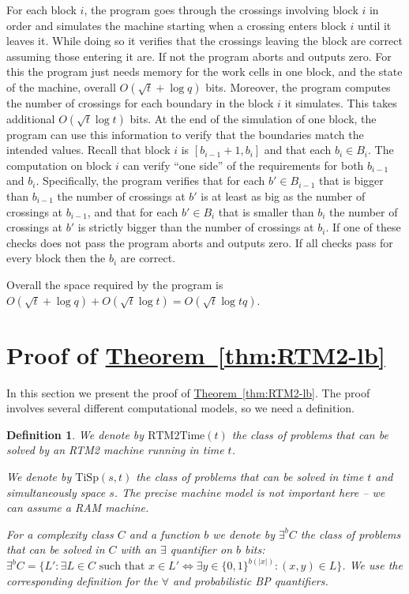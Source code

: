 \documentclass[11pt]{article}
\numberwithin{equation}{section}
\theoremstyle{definition}
\theoremstyle{plain}
\newcommand{\expref}[2]{\hyperref[#2]{#1~\ref{#2}}}
\newtheorem{defn}[theorem]{Definition}
\newcommand{\zo}{\{0, 1\}}
\newcommand{\TiSp}[2]{\ensuremath{\mathrm{TiSp} \left(#1,#2 \right)}}
\newcommand{\RTMTime}[1]{\ensuremath{\mathrm{RTM2Time} \left( #1 \right)}}
\begin{document}
For each block $i$, the program goes through the crossings involving
block $i$ in order and simulates the machine starting when a crossing
enters block $i$ until it leaves it. While doing so it verifies that
the crossings leaving the block are correct assuming those entering
it are. If not the program aborts and outputs zero. For this the program
just needs memory for the work cells in one block, and the state of
the machine, overall $O(\sqrt{t}+\log q)$ bits. Moreover, the program
computes the number of crossings for each boundary in the block $i$
it simulates. This takes additional $O(\sqrt{t}\log t)$ bits. At
the end of the simulation of one block, the program can use this information
to verify that the boundaries match the intended values. Recall that
block $i$ is $[b_{i-1}+1,b_{i}]$ and that each $b_{i}\in B_{i}$.
The computation on block $i$ can verify ``one side'' of the requirements
for both $b_{i-1}$ and $b_{i}$. Specifically, the program verifies
that for each $b'\in B_{i-1}$ that is bigger than $b_{i-1}$ the
number of crossings at $b'$ is at least as big as the number of crossings
at $b_{i-1}$, and that for each $b'\in B_{i}$ that is smaller than
$b_{i}$ the number of crossings at $b'$ is strictly bigger than
the number of crossings at $b_{i}$. If one of these checks does not
pass the program aborts and outputs zero. If all checks pass for every
block then the $b_{i}$ are correct.

Overall the space required by the program is $O(\sqrt{t}+\log q)+O(\sqrt{t}\log t)=O(\sqrt{t}\log tq)$.

\section{Proof of \expref{Theorem}{thm:RTM2-lb} \label{sec:Proof-of-lower-bound}}
%

In this section we present the proof of \expref{Theorem}{thm:RTM2-lb}.
The proof involves several different computational models, so we need
a definition.
\begin{defn}
We denote by $\RTMTime{t}$ the class of problems that can be solved
by an RTM2 machine running in time $t$.

We denote by $\TiSp{s}{t}$ the class of problems that can be solved
in time $t$ and simultaneously space $s$. The precise machine model
is not important here -- we can assume a RAM machine.

For a complexity class $C$ and a function $b$ we denote by $\exists^{b}C$
the class of problems that can be solved in $C$ with an $\exists$
quantifier on $b$ bits: $\exists^{b}C=\{L':\exists L\in C\text{ such that }x\in L'\Leftrightarrow\exists y\in\zo^{b(|x|)}:(x,y)\in L\}$.
We use the corresponding definition for the $\forall$ and probabilistic
BP quantifiers.
\end{defn}
\end{document}
